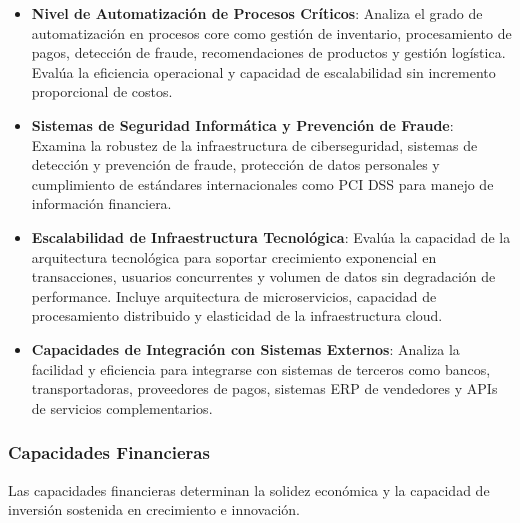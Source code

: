 \begin{itemize}
\item \textbf{Nivel de Automatización de Procesos Críticos}: Analiza el grado de automatización en procesos core como gestión de inventario, procesamiento de pagos, detección de fraude, recomendaciones de productos y gestión logística. Evalúa la eficiencia operacional y capacidad de escalabilidad sin incremento proporcional de costos.

\item \textbf{Sistemas de Seguridad Informática y Prevención de Fraude}: Examina la robustez de la infraestructura de ciberseguridad, sistemas de detección y prevención de fraude, protección de datos personales y cumplimiento de estándares internacionales como PCI DSS para manejo de información financiera.

\item \textbf{Escalabilidad de Infraestructura Tecnológica}: Evalúa la capacidad de la arquitectura tecnológica para soportar crecimiento exponencial en transacciones, usuarios concurrentes y volumen de datos sin degradación de performance. Incluye arquitectura de microservicios, capacidad de procesamiento distribuido y elasticidad de la infraestructura cloud.

\item \textbf{Capacidades de Integración con Sistemas Externos}: Analiza la facilidad y eficiencia para integrarse con sistemas de terceros como bancos, transportadoras, proveedores de pagos, sistemas ERP de vendedores y APIs de servicios complementarios.
\end{itemize}

\subsubsection{Capacidades Financieras}

Las capacidades financieras determinan la solidez económica y la capacidad de inversión sostenida en crecimiento e innovación.

